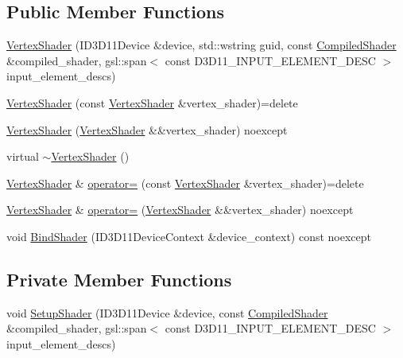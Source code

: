 \subsection*{Public Member Functions}
\begin{DoxyCompactItemize}
\item 
\mbox{\hyperlink{classmage_1_1rendering_1_1_vertex_shader_ae04ee8a21c7f77f1ef14dbbeb9842293}{Vertex\+Shader}} (I\+D3\+D11\+Device \&device, std\+::wstring guid, const \mbox{\hyperlink{classmage_1_1rendering_1_1_compiled_shader}{Compiled\+Shader}} \&compiled\+\_\+shader, gsl\+::span$<$ const D3\+D11\+\_\+\+I\+N\+P\+U\+T\+\_\+\+E\+L\+E\+M\+E\+N\+T\+\_\+\+D\+E\+SC $>$ input\+\_\+element\+\_\+descs)
\item 
\mbox{\hyperlink{classmage_1_1rendering_1_1_vertex_shader_a9236dfa05a74b64bdb0cb404b917d533}{Vertex\+Shader}} (const \mbox{\hyperlink{classmage_1_1rendering_1_1_vertex_shader}{Vertex\+Shader}} \&vertex\+\_\+shader)=delete
\item 
\mbox{\hyperlink{classmage_1_1rendering_1_1_vertex_shader_a2123d4bf4054ecb0de0c0491c59df0c1}{Vertex\+Shader}} (\mbox{\hyperlink{classmage_1_1rendering_1_1_vertex_shader}{Vertex\+Shader}} \&\&vertex\+\_\+shader) noexcept
\item 
virtual \mbox{\hyperlink{classmage_1_1rendering_1_1_vertex_shader_a4c57483ff1995a235472787b72ad4577}{$\sim$\+Vertex\+Shader}} ()
\item 
\mbox{\hyperlink{classmage_1_1rendering_1_1_vertex_shader}{Vertex\+Shader}} \& \mbox{\hyperlink{classmage_1_1rendering_1_1_vertex_shader_a4dff0bd19a0242300fbde0cc0a4497c4}{operator=}} (const \mbox{\hyperlink{classmage_1_1rendering_1_1_vertex_shader}{Vertex\+Shader}} \&vertex\+\_\+shader)=delete
\item 
\mbox{\hyperlink{classmage_1_1rendering_1_1_vertex_shader}{Vertex\+Shader}} \& \mbox{\hyperlink{classmage_1_1rendering_1_1_vertex_shader_a2d63073a65a136f2afa898af67eedb8b}{operator=}} (\mbox{\hyperlink{classmage_1_1rendering_1_1_vertex_shader}{Vertex\+Shader}} \&\&vertex\+\_\+shader) noexcept
\item 
void \mbox{\hyperlink{classmage_1_1rendering_1_1_vertex_shader_aa7090e902c68760713513fbfa33a1553}{Bind\+Shader}} (I\+D3\+D11\+Device\+Context \&device\+\_\+context) const noexcept
\end{DoxyCompactItemize}
\subsection*{Private Member Functions}
\begin{DoxyCompactItemize}
\item 
void \mbox{\hyperlink{classmage_1_1rendering_1_1_vertex_shader_a09e717d181f09bd4e50a758bd804705b}{Setup\+Shader}} (I\+D3\+D11\+Device \&device, const \mbox{\hyperlink{classmage_1_1rendering_1_1_compiled_shader}{Compiled\+Shader}} \&compiled\+\_\+shader, gsl\+::span$<$ const D3\+D11\+\_\+\+I\+N\+P\+U\+T\+\_\+\+E\+L\+E\+M\+E\+N\+T\+\_\+\+D\+E\+SC $>$ input\+\_\+element\+\_\+descs)
\end{DoxyCompactItemize}
